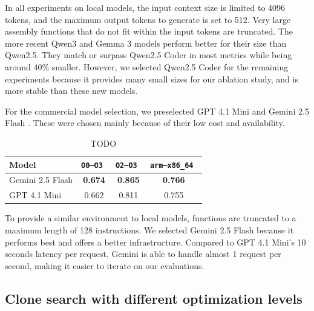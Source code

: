 In all experiments on local models, the input context size is limited to 4096 tokens, and the maximum output tokens to generate is set to 512.
Very large assembly functions that do not fit within the input tokens are truncated. The more recent Qwen3 and Gemma 3
models perform better for their size than Qwen2.5. They match or surpass Qwen2.5 Coder in most metrics while being around \(40\%\)
smaller. However, we selected Qwen2.5 Coder for the remaining experiments because it provides many small sizes for our ablation study,
and is more stable than these new models.

For the commercial model selection, we preselected GPT 4.1 Mini \cite{gpt4} and Gemini 2.5 Flash \cite{gemini2.5}.
These were chosen mainly because of their low cost and availability.

{
    \renewcommand{\arraystretch}{1.1}
    \centering
    \begin{table}[h]
    \begin{tabular}{|l|ccc|} \hline
    Model            & \tt O0--O3 & \tt O2--O3 & \tt arm--x86\_64 \\ \hline
    Gemini 2.5 Flash & \bf 0.674  & \bf 0.865  & \bf 0.766        \\
    GPT 4.1 Mini     & 0.662      & 0.811      & 0.755            \\ \hline
    \end{tabular}
    \caption{TODO}
    \end{table}
}

To provide a similar environment to local models, functions are truncated to a maximum length of 128 instructions.
We selected Gemini 2.5 Flash because it performs best and offers a better infrastructure. Compared to GPT 4.1 Mini's 10 seconds
latency per request, Gemini is able to handle almost 1 request per second, making it easier to iterate on our evaluations.

\subsection{Clone search with different optimization levels}

